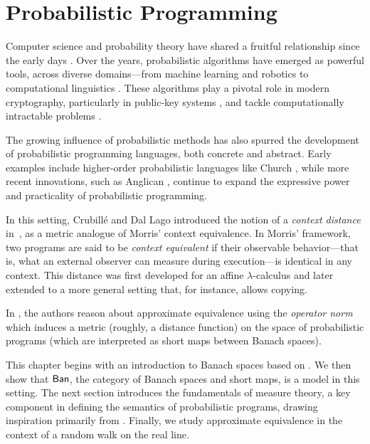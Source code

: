 \chapter{Probabilistic Programming} \label{ch:pp}


Computer science and probability theory have shared a fruitful relationship since the early days \cite{de1956computability}. Over the years, probabilistic algorithms have emerged as powerful tools, across diverse domains—from machine learning \cite{pearl2014}  and robotics \cite{thrun2002robotic} to computational linguistics \cite{manning1999foundations}. These algorithms play a pivotal role in modern cryptography, particularly in public-key systems \cite{goldwasserProbabilisticEncryption1984}, and tackle computationally intractable  problems \cite{motwaniRandomizedAlgorithms1995}.

The growing influence of probabilistic methods has also spurred the development of probabilistic programming languages, both concrete and abstract. Early examples include higher-order probabilistic languages like Church \cite{Church2008}, while more recent innovations, such as Anglican \cite{Anglican2015}, continue to expand the expressive power and practicality of probabilistic programming.


In this setting, Crubillé and Dal Lago introduced the notion of a \emph{context distance} in~\cite{crubilleMetricReasoningLterms2015,crubilleMetricReasoninglambda2017}, as a metric analogue of Morris' context equivalence. In Morris' framework, two programs are said to be \emph{context equivalent} if their observable behavior---that is, 
what an external observer can measure during execution---is identical in any context.  This distance was first developed for an affine $\lambda$-calculus and later extended to a more general 
setting that, for instance, allows copying.

In \cite{dahlqvist2023syntactic}, the authors reason about approximate equivalence using the \emph{operator norm} which induces a metric (roughly, a distance function) on the space of probabilistic programs (which are interpreted as short maps between Banach spaces).

This chapter begins with an introduction to Banach spaces based on \cite{rudin91functional,InfiniteDimensionalAnalysis2006, ryanIntroductionTensorProducts2013}. We then show that $\mathsf{Ban}$, the category of Banach spaces and short maps, is a model in this setting. The  next section  introduces the fundamentals of measure theory, a key component in defining the semantics of probabilistic programs, drawing inspiration primarily from \cite{dahlqvistSemanticsProbabilisticProgramming2020a, bogachevMeasureTheory2007,InfiniteDimensionalAnalysis2006}.  
Finally, we study approximate equivalence in the context of a random walk on the real line.



